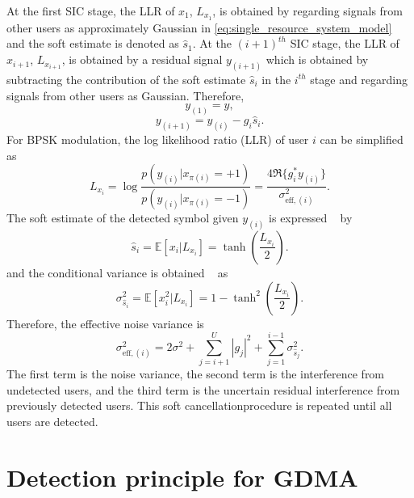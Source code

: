 At the first SIC stage, the LLR of $x_1$, $L_{x_1}$, is obtained by regarding signals from other users as approximately Gaussian in \eqref{eq:single_resource_system_model} and the soft estimate is denoted as $\hat{s}_{1}$.
At the $(i+1)^{th}$ SIC stage, the LLR of $x_{i+1}$, $L_{x_{i+1}}$, is obtained by a residual signal $y_{(i+1)}$ which is obtained by subtracting the contribution of the soft estimate $\hat{s}_{i}$ in the $i^{th}$ stage and regarding signals from other users as Gaussian. Therefore, 
\begin{equation}
    y_{(1)} = y,
\end{equation}
\begin{equation}
 \label{eq:subtract}
    y_{(i+1)}
    =
    y_{(i)}
    -
    g_{i}\hat{s}_{i}.
\end{equation}
For BPSK modulation, the log likelihood ratio (LLR) of user $i$ can be simplified as
\begin{equation}
    \label{eq:LLR}
    L_{x_i}
    =
    \log
    \frac{
    p(y_{(i)}|x_{\pi(i)}=+1)
    }{
    p(y_{(i)}|x_{\pi(i)}=-1)
    }
    =
    \frac{
    4\Re\{
    g_{i}^* y_{(i)}\}
    }{
    \sigma_{\mathrm{eff},(i)}^{2}
    }.
\end{equation}
The soft estimate of the detected symbol given $y_{(i)}$ is expressed ~\cite{shapiro2005soft} by
\begin{equation}
    \label{eq:soft calculation}
    \hat{s}_{i}
    =
    \mathbb{E}\left[x_{i}|L_{x_i}\right]
    =
    \tanh\left(\frac{L_{x_i} }{2}\right).
\end{equation}
and the conditional variance is obtained ~\cite{shapiro2005soft} as
\begin{equation}
    \label{eq:soft variance}
    \sigma^2_{\hat{s}_i}
    =
    \mathbb{E}\left[x^2_i|L_{x_i}\right]
    =
    1-\tanh^2 \left(\frac{L_{x_i}}{2}\right).
\end{equation}
Therefore, the effective noise variance is
\begin{equation}
    \sigma_{\mathrm{eff},{(i)}}^2
    =
    2\sigma^2
    +
    \sum_{j=i+1}^{U}
    |g_{j}|^2
    + 
    \sum_{j=1}^{i-1}
    \sigma^2_{\hat{s}_{j}}.
\end{equation}
The first term is the noise variance, the second term is the interference from undetected users, and the third term is the uncertain residual interference from previously detected users.
This soft cancellationprocedure is repeated until all users are detected.

\section{Detection principle for GDMA}
\label{sec:Detection principle for GDMA}

